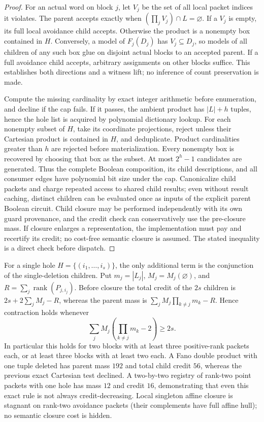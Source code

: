 \documentclass[11pt]{article}
\begin{document}
\begin{proof}
For an actual word on block $j$, let $V_j$ be the set of all local packet indices it violates. The parent accepts exactly when $(\prod_j V_j)\cap L=\varnothing$. If a $V_j$ is empty, its full local avoidance child accepts. Otherwise the product is a nonempty box contained in $H$. Conversely, a model of $F_j(D_j)$ has $V_j\subseteq D_j$, so models of all children of any such box glue on disjoint actual blocks to an accepted parent. If a full avoidance child accepts, arbitrary assignments on other blocks suffice. This establishes both directions and a witness lift; no inference of count preservation is made.

Compute the missing cardinality by exact integer arithmetic before enumeration, and decline if the cap fails. If it passes, the ambient product has $|L|+h$ tuples, hence the hole list is acquired by polynomial dictionary lookup. For each nonempty subset of $H$, take its coordinate projections, reject unless their Cartesian product is contained in $H$, and deduplicate. Product cardinalities greater than $h$ are rejected before materialization. Every nonempty box is recovered by choosing that box as the subset. At most $2^h-1$ candidates are generated. Thus the complete Boolean composition, its child descriptions, and all consumer edges have polynomial bit size under the cap. Canonicalize child packets and charge repeated access to shared child results; even without result caching, distinct children can be evaluated once as inputs of the explicit parent Boolean circuit. Child closure may be performed independently with its own guard provenance, and the credit check can conservatively use the pre-closure mass. If closure enlarges a representation, the implementation must pay and recertify its credit; no cost-free semantic closure is assumed. The stated inequality is a direct check before dispatch.
\end{proof}
For a single hole $H=\{(i_1,\ldots,i_s)\}$, the only additional term is the conjunction of the single-deletion children. Put $m_j=|L_j|$, $M_j=M_j(\varnothing)$, and $R=\sum_j\operatorname{rank}(P_{j,i_j})$. Before closure the total credit of the $2s$ children is $2s+2\sum_j M_j-R$, whereas the parent mass is $\sum_j M_j\prod_{k\ne j}m_k-R$. Hence contraction holds whenever
\[
\sum_j M_j\left(\prod_{k\ne j}m_k-2\right)\ge2s.
\]
In particular this holds for two blocks with at least three positive-rank packets each, or at least three blocks with at least two each. A Fano double product with one tuple deleted has parent mass $192$ and total child credit $56$, whereas the previous exact Cartesian test declined. A two-by-two registry of rank-two point packets with one hole has mass $12$ and credit $16$, demonstrating that even this exact rule is not always credit-decreasing. Local singleton affine closure is stagnant on rank-two avoidance packets (their complements have full affine hull); no semantic closure cost is hidden.
\end{document}
